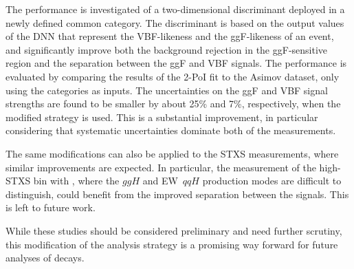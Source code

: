 The performance is investigated of a two-dimensional discriminant deployed in a newly defined common \TwoJet category.
The discriminant is based on the output values of the DNN that represent the VBF-likeness and the ggF-likeness of an event, and significantly improve both the background rejection in the ggF-sensitive region and the separation between the ggF and VBF signals.
The performance is evaluated by comparing the results of the 2-PoI fit to the Asimov dataset, only using the \TwoJet categories as inputs. 
The uncertainties on the ggF and VBF signal strengths are found to be smaller by about 25\% and 7\%, respectively, when the modified \TwoJet strategy is used. 
This is a substantial improvement, in particular considering that systematic uncertainties dominate both of the measurements. 

The same modifications can also be applied to the STXS measurements, where similar improvements are expected. In particular, the measurement of the high-\pT STXS bin with \TwoJet, where the $ggH$ and EW~$qqH$ production modes are difficult to distinguish, could benefit from the improved separation between the signals. This is left to future work. 

While these studies should be considered preliminary and need further scrutiny, this modification of the \TwoJet analysis strategy is a promising way forward for future analyses of \HWW decays.






